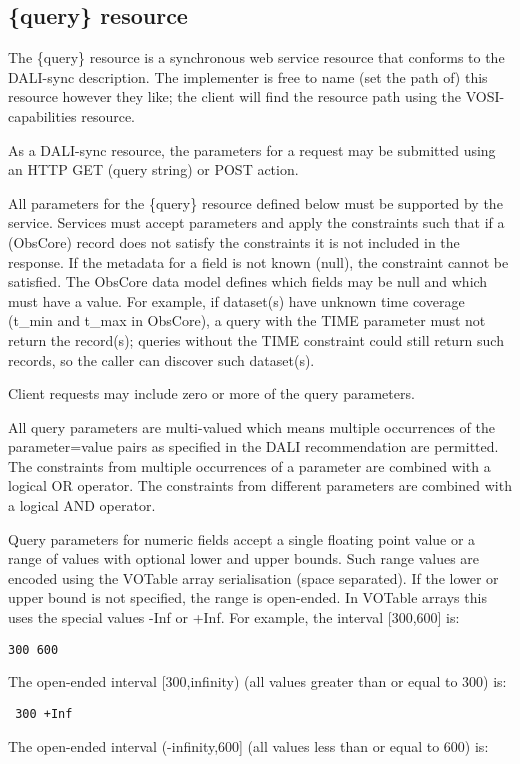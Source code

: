 \documentclass[11pt,a4paper]{ivoa}
\begin{document}
\subsection{\{query\} resource}
\label{sec:query}
The \{query\} resource is a synchronous web service resource that conforms to the DALI-sync description. The implementer is free to name (set the path of) this resource however they like; the client will find the resource path using the VOSI-capabilities resource. 

As a DALI-sync resource, the parameters for a request may be submitted using an HTTP GET (query string) or POST action.

All parameters for the \{query\} resource defined below must be supported by the service. Services must accept parameters and apply the constraints such that if a (ObsCore) record does not satisfy the constraints it is not included in the response. If the metadata for a field is not known (null), the constraint cannot be satisfied. The ObsCore data model defines which fields may be null and which must have a value. For example, if dataset(s) have unknown time coverage (t\_min and t\_max in ObsCore), a query with the TIME parameter must not return the record(s); queries without the TIME constraint could still return such records, so the caller can discover such dataset(s).

Client requests may include zero or more of the query parameters.

All query parameters are multi-valued which means multiple occurrences of the parameter=value pairs as specified in the DALI recommendation are permitted. The constraints from multiple occurrences of a parameter are combined with a logical OR operator. The constraints from different parameters are combined with a logical AND operator.

Query parameters for numeric fields accept a single floating point value or a range of values with optional lower and upper bounds. Such range values are encoded using the VOTable array serialisation (space separated). If  the lower or upper bound is not specified, the range is open-ended. In VOTable arrays this uses the special values -Inf or +Inf. For example, the interval [300,600] is:

\begin{lstlisting}
300 600 
\end{lstlisting}
The open-ended interval [300,infinity) (all values greater than or equal to 300) is:

\begin{lstlisting}
 300 +Inf 
\end{lstlisting}
The open-ended interval (-infinity,600] (all values less than or equal to 600) is:
\end{document}
